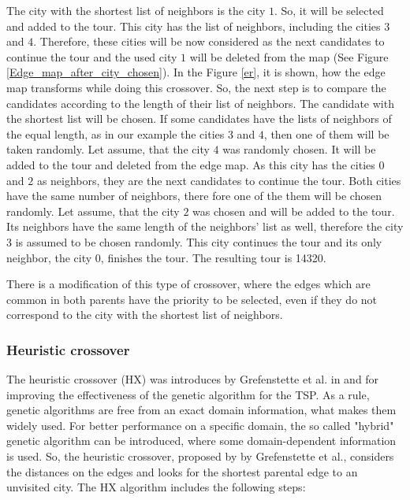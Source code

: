 \documentclass[a4paper, 12pt, headings=standardclasses]{scrartcl}
\begin{document}
 The city with the shortest list of neighbors is the city $1$. So, it will be selected and added to the tour. This city has the list of neighbors, including the cities $3$ and $4$. Therefore, these cities will be now considered as the next candidates to continue the tour and the used city $1$ will be deleted from the map (See Figure \ref{Edge_map_after_city_chosen}). In the Figure \ref{er}, it is shown, how the edge map transforms while doing this crossover. So, the next step is to compare  the candidates according to the length of their list of neighbors. The candidate with the shortest list will be chosen. If some candidates have the lists of neighbors of the equal length, as in our example the cities $3$ and $4$, then one of them will be taken randomly. Let assume, that the city $4$ was randomly chosen. It will be added to the tour and deleted from the edge map. As this city has the cities $0$ and $2$ as neighbors, they are the next candidates to continue the tour. Both cities have the same number of neighbors, there fore one of the them will be chosen randomly. Let assume, that the city $2$ was chosen and will be added to the tour. Its neighbors have the same length of the neighbors' list as well, therefore the city $3$ is assumed to be chosen randomly. This city continues the tour and its only neighbor, the city $0$, finishes the tour. The resulting tour is 14320.\par
 There is a modification of this type of crossover, where the edges which are common in both parents have the priority to be selected, even if they do not correspond to the city with the shortest list of neighbors.
 
\subsubsection{Heuristic crossover}
The heuristic crossover (HX) was introduces by Grefenstette et al. in \cite{grefenstette1985genetic} and \cite{grefenstette1987incorporating} for improving the effectiveness of the genetic algorithm for the TSP. As a rule, genetic algorithms are free from an exact domain information, what makes them widely used.  For better performance on a specific domain, the so called "hybrid" genetic algorithm can be introduced, where some domain-dependent information is used. So, the heuristic crossover, proposed by  by Grefenstette et al., considers the distances on the edges and looks for the shortest parental edge to an unvisited city. The HX algorithm includes the following steps:
\end{document}
